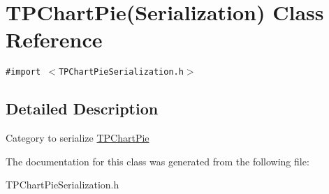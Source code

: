 \hypertarget{interface_t_p_chart_pie_07_serialization_08}{
\section{TPChartPie(Serialization) Class Reference}
\label{interface_t_p_chart_pie_07_serialization_08}
}
{\tt \#import $<$TPChartPieSerialization.h$>$}



\subsection{Detailed Description}
Category to serialize \hyperlink{interface_t_p_chart_pie}{TPChartPie} 

The documentation for this class was generated from the following file:\begin{CompactItemize}
\item 
TPChartPieSerialization.h\end{CompactItemize}
